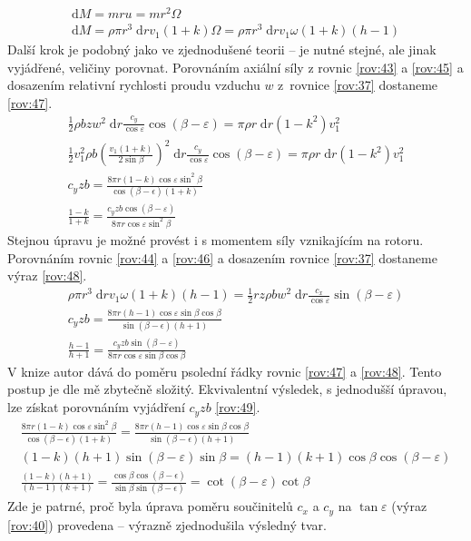 	\begin{eqnarray}
		\label{rov:46}
		\mathrm{d}M = mru = mr^2\Omega \nonumber \\
		\mathrm{d}M=\rho\pi r^3\; \mathrm{d}r v_1(1+k)\Omega = \rho\pi r^3\; \mathrm{d}r v_1\omega(1+k)(h-1)
		\end{eqnarray}
		Další krok je podobný jako ve zjednodušené teorii – je nutné stejné, ale jinak vyjádřené, veličiny porovnat. Porovnáním axiální síly z rovnic \eqref{rov:43} a \eqref{rov:45} a dosazením relativní rychlosti proudu vzduchu $w$ z~rovnice \eqref{rov:37} dostaneme \eqref{rov:47}\cite{Rychetnik:Motory}.
		\begin{eqnarray}
			\label{rov:47}
			\frac{1}{2}\rho bzw^2\;\mathrm{d}r\frac{c_y}{\cos\varepsilon}\cos(\beta-\varepsilon)=\pi\rho r\;\mathrm{d}r(1-k^2)v_1^2 \nonumber \\
			\frac{1}{2} v_1^2\rho b \left(\frac{v_1(1+k)}{2\sin\beta}\right)^2\;\mathrm{d}r\frac{c_y}{\cos\varepsilon}\cos(\beta-\varepsilon)=\pi\rho r\; \mathrm{d}r(1-k^2)v_1^2 \nonumber \\
			c_y zb = \frac{8\pi r(1-k)\cos\varepsilon\sin^2 \beta}{\cos(\beta-\epsilon)(1+k)} \nonumber \\
			\frac{1-k}{1+k}=\frac{c_y zb \cos(\beta-\varepsilon)}{8\pi r \cos\varepsilon\sin^2\beta}
		\end{eqnarray}
		Stejnou úpravu je možné provést i s momentem síly vznikajícím na rotoru. Porovnáním rovnic \eqref{rov:44} a \eqref{rov:46} a dosazením rovnice \eqref{rov:37} dostaneme výraz \eqref{rov:48}\cite{Rychetnik:Motory}.
		\begin{eqnarray}
			\label{rov:48}
			\rho\pi r^3\;\mathrm{d}r v_1\omega(1+k)(h-1)=\frac{1}{2}rz\rho bw^2\;\mathrm{d}r\frac{c_x}{\cos \varepsilon}\sin(\beta-\varepsilon) \nonumber \\
			c_y zb = \frac{8\pi r(h-1)\cos\varepsilon\sin \beta \cos\beta}{\sin(\beta-\epsilon)(h+1)} \nonumber \\
			\frac{h-1}{h+1}=\frac{c_y zb \sin(\beta-\varepsilon)}{8\pi r \cos\varepsilon\sin\beta\cos\beta}
		\end{eqnarray}
		V knize \cite{Rychetnik:Motory} autor dává do poměru psolední řádky rovnic \eqref{rov:47} a \eqref{rov:48}. Tento postup je dle mě zbytečně složitý. Ekvivalentní výsledek, s jednodušší úpravou, lze získat porovnáním  vyjádření $c_yzb$ \eqref{rov:49}.
		\begin{eqnarray}
			\label{rov:49}
			\frac{8\pi r(1-k)\cos\varepsilon\sin^2 \beta}{\cos(\beta-\epsilon)(1+k)}=\frac{8\pi r(h-1)\cos\varepsilon\sin \beta \cos\beta}{\sin(\beta-\epsilon)(h+1)} \nonumber \\
			(1-k)(h+1)\sin(\beta-\varepsilon)\sin\beta=(h-1)(k+1)\cos\beta\cos(\beta-\varepsilon) \nonumber \\
			\frac{(1-k)(h+1)}{(h-1)(k+1)}=\frac{\cos\beta\cos(\beta-\epsilon)}{\sin\beta\sin(\beta-\epsilon)}=\cot(\beta-\varepsilon)\cot\beta
		\end{eqnarray}
		Zde je patrné, proč byla úprava poměru součinitelů $c_x$ a $c_y$ na $\tan\varepsilon$ (výraz \eqref{rov:40}) provedena – výrazně zjednodušila výsledný tvar.
		
